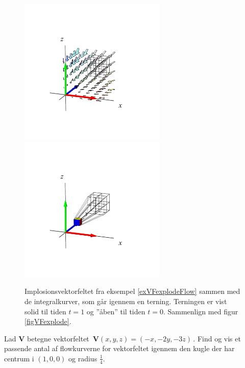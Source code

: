 \begin{figure}[h]
\centerline{\includegraphics[height=70mm]{FIGS/plotVFimplode1}\includegraphics[height=70mm]{FIGS/plotVFimplode2}}
\begin{center}
\caption{\small{Implosionsvektorfeltet fra
eksempel \ref{exVFexplodeFlow} sammen med de
integralkurver, som går igennem en terning.  Terningen er vist solid til tiden $t=1$ og ''åben'' til tiden $t=0$. Sammenlign med figur \ref{figVFexplode}.}}
\label{figVFimplode}
\end{center}
\end{figure}




\begin{exercise}
Lad ${\mathbf{V}}$ betegne vektorfeltet $\,
{\mathbf{V}}(x,y,z) = (-x, -2y, -3z)\, $. Find og vis
 et passende antal af
flowkurverne for vektorfeltet igennem den kugle
der har centrum i $(1,0,0)$ og radius
$\frac{1}{4}$.
\end{exercise}












